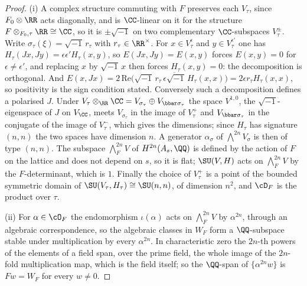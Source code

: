 \begin{proof}
(i) A complex structure commuting with $F$ preserves each $V_{\tau}$, since
$F_{0}\otimes\RR$ acts diagonally, and is $\CC$-linear on it for the
structure $F\otimes_{F_{0},\tau}\RR\cong\CC$, so it is $\pm\sqrt{-1}$ on two
complementary $\CC$-subspaces $V_{\tau}^{\pm}$. Write
$\sigma_{\tau}(\xi)=\sqrt{-1}\,r_{\tau}$ with $r_{\tau}\in\RR^{\times}$. For
$x\in V^{\epsilon}_{\tau}$ and $y\in V^{\epsilon'}_{\tau}$ one has
$H_{\tau}(Jx,Jy)=\epsilon\epsilon'H_{\tau}(x,y)$, so
$E(Jx,Jy)=E(x,y)$ forces $E(x,y)=0$ for $\epsilon\ne\epsilon'$, and replacing
$x$ by $\sqrt{-1}\,x$ then forces $H_{\tau}(x,y)=0$: the decomposition is
orthogonal. And $E(x,Jx)=2\,\mathrm{Re}\bigl(\sqrt{-1}\,r_{\tau}\,
\overline{\epsilon\sqrt{-1}}\,H_{\tau}(x,x)\bigr)=2\epsilon r_{\tau}H_{\tau}(x,x)$,
so positivity is the sign condition stated. Conversely such a decomposition
defines a polarised $J$. Under $V_{\tau}\otimes_{\RR}\CC=V_{\sigma_{\tau}}
\oplus V_{\bbar\sigma_{\tau}}$ the space $V^{1,0}$, the $\sqrt{-1}$-eigenspace
of $J$ on $V_{\CC}$, meets $V_{\sigma_{\tau}}$ in the image of $V_{\tau}^{+}$
and $V_{\bbar\sigma_{\tau}}$ in the conjugate of the image of $V_{\tau}^{-}$,
which gives the dimensions; since $H_{\tau}$ has signature $(n,n)$ the two
spaces have dimension $n$. A generator $\alpha_{\sigma}$ of
$\bigwedge^{2n}V_{\sigma}$ is then of type $(n,n)$. The subspace
$\bigwedge^{2n}_{F}V$ of $H^{2n}(A_{s},\QQ)$ is defined by the action of $F$
on the lattice and does not depend on $s$, so it is flat; $\SU(V,H)$ acts on
$\bigwedge^{2n}_{F}V$ by the $F$-determinant, which is $1$. Finally the
choice of $V_{\tau}^{+}$ is a point of the bounded symmetric domain of
$\SU(V_{\tau},H_{\tau})\cong\SU(n,n)$, of dimension $n^{2}$, and $\cD_{F}$ is
the product over $\tau$.

(ii) For $\alpha\in\cO_{F}$ the endomorphism $\iota(\alpha)$ acts on
$\bigwedge^{2n}_{F}V$ by $\alpha^{2n}$, through an algebraic correspondence,
so the algebraic classes in $W_{F}$ form a $\QQ$-subspace stable under
multiplication by every $\alpha^{2n}$. In characteristic zero the $2n$-th
powers of the elements of a field span, over the prime field, the whole
image of the $2n$-fold multiplication map, which is the field itself; so the
$\QQ$-span of $\{\alpha^{2n}w\}$ is $Fw=W_{F}$ for every $w\ne0$.


\end{proof}
